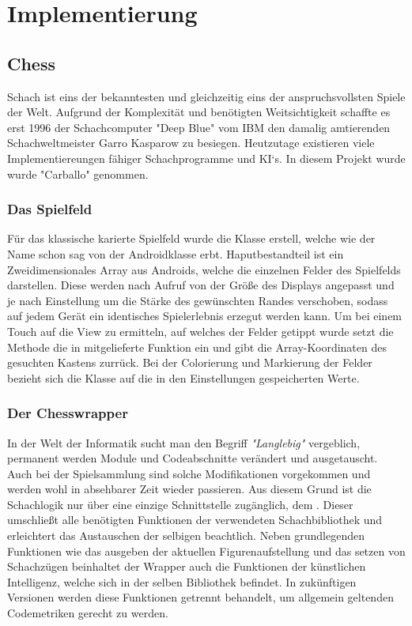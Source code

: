 \chapter{Implementierung}

\section{Chess}
\sectionauthor{\oliver}

Schach ist eins der bekanntesten und gleichzeitig eins der anspruchsvollsten Spiele der Welt. Aufgrund der Komplexität
und benötigten Weitsichtigkeit schaffte es erst 1996 der Schachcomputer "Deep Blue" vom IBM den damalig amtierenden
Schachweltmeister Garro Kasparow zu besiegen. Heutzutage existieren viele Implementiereungen fähiger
Schachprogramme und KI`s. In diesem Projekt wurde wurde "Carballo" genommen.

\subsection{Das Spielfeld}

Für das klassische karierte Spielfeld wurde die Klasse  erstell,
welche wie der Name schon sag von der Androidklasse  erbt. Haputbestandteil ist ein
Zweidimensionales Array aus Androids, welche die einzelnen Felder des Spielfelds darstellen.
Diese werden nach Aufruf von  der Größe des Displays angepasst und je nach
Einstellung um die Stärke des gewünschten Randes verschoben, sodass auf jedem Gerät ein identisches
Spielerlebnis erzegut werden kann. Um bei einem Touch auf die View zu ermitteln, auf welches der
Felder getippt wurde setzt die Methode  die in 
mitgelieferte Funktion  ein und gibt die Array-Koordinaten des gesuchten
Kastens zurrück. Bei der Colorierung und Markierung der Felder bezieht sich die Klasse auf die in den
Einstellungen gespeicherten Werte.

\subsection{Der Chesswrapper}

In der Welt der Informatik sucht man den Begriff \emph{"Langlebig"} vergeblich, permanent werden
Module und Codeabschnitte verändert und ausgetauscht. Auch bei der Spielsammlung sind solche
Modifikationen vorgekommen und werden wohl in absehbarer Zeit wieder passieren. Aus diesem Grund
ist die Schachlogik nur über eine einzige Schnittstelle zugänglich, dem . Dieser
umschließt alle benötigten Funktionen der verwendeten Schachbibliothek und erleichtert das Austauschen
der selbigen beachtlich. Neben grundlegenden Funktionen wie das ausgeben der aktuellen Figurenaufstellung
und das setzen von Schachzügen beinhaltet der Wrapper auch die Funktionen der künstlichen Intelligenz, welche
sich in der selben Bibliothek befindet. In zukünftigen Versionen werden diese Funktionen getrennt behandelt,
um allgemein geltenden Codemetriken gerecht zu werden.